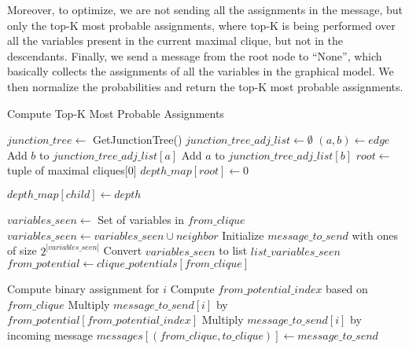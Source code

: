 \documentclass[a4paper,12pt]{article}
\begin{document}
Moreover, to optimize, we are not sending all the assignments in the message, but only the top-K most probable assignments, where top-K is being performed over all the variables present in the current maximal clique, but not in the descendants. Finally, we send a message from the root node to ``None'', which basically collects the assignments of all the variables in the graphical model. We then normalize the probabilities and return the top-K most probable assignments.

\begin{algorithm}
    \footnotesize
    \caption{Compute Top-K Most Probable Assignments}
    \begin{algorithmic}[1]
    \State $junction\_tree \gets$ GetJunctionTree()
    \State $junction\_tree\_adj\_list \gets \emptyset$
    \State $(a, b) \gets edge$
    \State Add $b$ to $junction\_tree\_adj\_list[a]$
    \State Add $a$ to $junction\_tree\_adj\_list[b]$
    \EndFor
    \State $root \gets$ tuple of maximal cliques[0]
\State $depth\_map[root] \gets 0$

            \State $depth\_map[child] \gets depth$
            \State {}
        \EndIf
    \EndFor
\EndProcedure
\State {}

    \State $variables\_seen \gets$ Set of variables in $from\_clique$
            \State $variables\_seen \gets variables\_seen \cup neighbor$
        \EndIf
    \EndFor
    \State Initialize $message\_to\_send$ with ones of size $2^{|variables\_seen|}$
    \State Convert $variables\_seen$ to list $list\_variables\_seen$
    \State $from\_potential \gets clique\_potentials[from\_clique]$
    
        \State Compute binary assignment for $i$
        \State Compute $from\_potential\_index$ based on $from\_clique$
        \State Multiply $message\_to\_send[i]$ by $from\_potential[from\_potential\_index]$
                \State Multiply $message\_to\_send[i]$ by incoming message
            \EndIf
        \EndFor
    \EndFor
    \State $messages[(from\_clique, to\_clique)] \gets message\_to\_send$
\EndProcedure


\end{algorithmic}
\end{algorithm}
\end{document}
